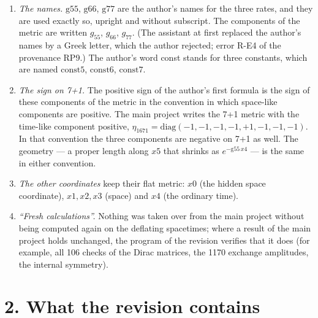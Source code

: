 \documentclass[
  10pt,
]{article}
\providecommand{\tightlist}{%
  \setlength{\itemsep}{0pt}\setlength{\parskip}{0pt}}
\begin{document}
\begin{enumerate}
\def\labelenumi{\arabic{enumi}.}
\tightlist
\item
  \emph{The names.} \(\mathrm{g55}\), \(\mathrm{g66}\), \(\mathrm{g77}\)
  are the author's names for the three rates, and they are used exactly
  so, upright and without subscript. The components of the metric are
  written \(g_{55}\), \(g_{66}\), \(g_{77}\). (The assistant at first
  replaced the author's names by a Greek letter, which the author
  rejected; error R-E4 of the provenance RP9.) The author's word const
  stands for three constants, which are named \(\mathrm{const5}\),
  \(\mathrm{const6}\), \(\mathrm{const7}\).
\item
  \emph{The sign on 7+1.} The positive sign of the author's first
  formula is the sign of these components of the metric in the
  convention in which space-like components are positive. The main
  project writes the 7+1 metric with the time-like component positive,
  \(\eta_{1671}=\mathrm{diag}(-1,-1,-1,-1,+1,-1,-1,-1)\). In that
  convention the three components are negative on 7+1 as well. The
  geometry --- a proper length along \(x5\) that shrinks as
  \(e^{-\mathrm{g55}\,x4}\) --- is the same in either convention.
\item
  \emph{The other coordinates} keep their flat metric: \(x0\) (the
  hidden space coordinate), \(x1,x2,x3\) (space) and \(x4\) (the
  ordinary time).
\item
  \emph{``Fresh calculations''.} Nothing was taken over from the main
  project without being computed again on the deflating spacetimes;
  where a result of the main project holds unchanged, the program of the
  revision verifies that it does (for example, all 106 checks of the
  Dirac matrices, the 1170 exchange amplitudes, the internal symmetry).
\end{enumerate}

\hypertarget{what-the-revision-contains}{%
\section{2. What the revision
contains}\label{what-the-revision-contains}}
\end{document}
